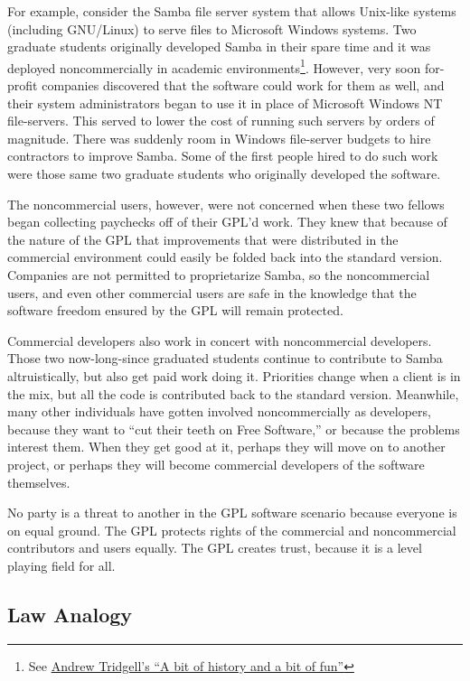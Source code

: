 For example, consider the Samba file server system that allows Unix-like
systems (including GNU/Linux) to serve files to Microsoft Windows systems.
Two graduate students originally developed Samba in their spare time and
it was deployed noncommercially in academic environments\footnote{See
  \href{http://turtle.ee.ncku.edu.tw/docs/samba/history}{Andrew Tridgell's
    ``A bit of history and a bit of fun''}}.  However, very
soon for-profit companies discovered that the software could work for them
as well, and their system administrators began to use it in place of
Microsoft Windows NT file-servers.  This served to lower the cost of
running such servers by orders of magnitude. There was suddenly room in
Windows file-server budgets to hire contractors to improve Samba.  Some of
the first people hired to do such work were those same two graduate
students who originally developed the software.

The noncommercial users, however, were not concerned when these two
fellows began collecting paychecks off of their GPL'd work.  They knew
that because of the nature of the GPL that improvements that were
distributed in the commercial environment could easily be folded back into
the standard version.  Companies are not permitted to proprietarize
Samba, so the noncommercial users, and even other commercial users are
safe in the knowledge that the software freedom ensured by the GPL will remain
protected.

Commercial developers also work in concert with noncommercial
developers.  Those two now-long-since graduated students continue to
contribute to Samba altruistically, but also get paid work doing it.
Priorities change when a client is in the mix, but all the code is
contributed back to the standard version.  Meanwhile, many other
individuals have gotten involved noncommercially as developers,
because they want to ``cut their teeth on Free Software,'' or because
the problems interest them.  When they get good at it, perhaps they
will move on to another project, or perhaps they will become
commercial developers of the software themselves.

No party is a threat to another in the GPL software scenario because
everyone is on equal ground.  The GPL protects rights of the commercial
and noncommercial contributors and users equally. The GPL creates trust,
because it is a level playing field for all.

\subsection{Law Analogy}

